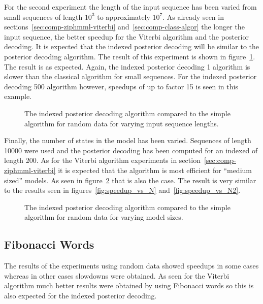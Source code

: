 For the second experiment the length of the input sequence has been varied from
small sequences of length $10^3$ to approximately $10^7$. As already seen in
sections~\ref{sec:comp-ziphmml-viterbi} and~\ref{sec:comp-class-algor} the
longer the input sequence, the better speedup for the Viterbi algorithm and the
posterior decoding. It is expected that the indexed posterior
decoding will be similar to the posterior decoding algorithm. The
result of this experiment is shown in
figure~\ref{fig:indexed_posterior_speedup_vs_T}. The result is as
expected. Again, the indexed posterior decoding 1 algorithm is slower than
the classical algorithm for small sequences. For the indexed posterior
decoding 500 algorithm however, speedups of up to factor 15 is seen in this
example.

\begin{figure}
  \centering
  
  \caption{The indexed posterior decoding algorithm compared to the simple
    algorithm for random data for varying input sequence lengths.}
  \label{fig:indexed_posterior_speedup_vs_T}
\end{figure}

Finally, the number of states in the model has been varied. Sequences of length
10000 were used and the posterior decoding has been computed for an indexed of
length 200. As for the Viterbi algorithm experiments in
section~\ref{sec:comp-ziphmml-viterbi} it is expected that the algorithm is
most efficient for ``medium sized'' models. As seen in
figure~\ref{fig:indexed_posterior_speedup_vs_N} that is also the case. The
result is very similar to the results seen in figures~\ref{fig:speedup_vs_N}
and~\ref{fig:speedup_vs_N2}.

\begin{figure}
  \centering
  
  \caption{The indexed posterior decoding algorithm compared to the simple
    algorithm for random data for varying model sizes.}
  \label{fig:indexed_posterior_speedup_vs_N}
\end{figure}

\subsection{Fibonacci Words}

The results of the experiments using random data showed speedups in some cases
whereas in other cases slowdowns were obtained. As seen for the Viterbi
algorithm much better results were obtained by using Fibonacci words so this
is also expected for the indexed posterior decoding.

